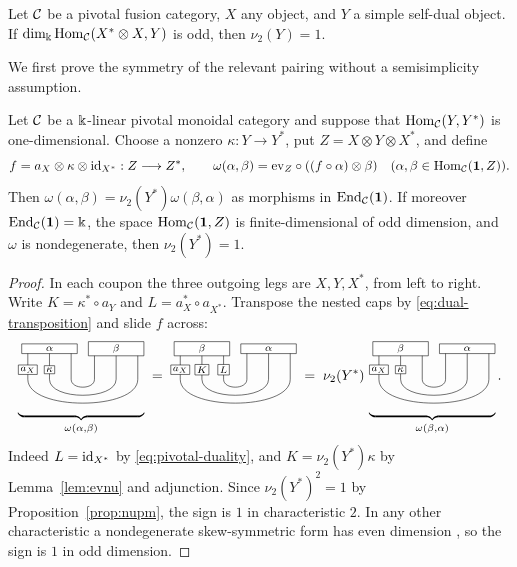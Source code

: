 \documentclass{amsart}
\begin{document}
\begin{theorem}\label{thm:FrobSchur}
Let $\mathcal{C}$ be a pivotal fusion category, $X$ any object, and $Y$ a simple
self-dual object. If $\dim_{\Bbbk}\mathrm{Hom}_{\mathcal{C}}(X^*\otimes X,Y)$ is odd, then
$\nu_2(Y)=1$.
\end{theorem}
We first prove the symmetry of the relevant pairing without a
semisimplicity assumption.
\begin{lemma}\label{prop:binu}\label{cor:inter}
Let $\mathcal{C}$ be a $\Bbbk$-linear pivotal monoidal category and suppose that $\mathrm{Hom}_{\mathcal{C}}(Y,Y^*)$ is one-dimensional.
Choose a nonzero $\kappa:Y\to Y^*$, put $Z=X\otimes Y\otimes X^*$, and
define
\[
 f=a_X\otimes\kappa\otimes\mathrm{id}_{X^*}:Z\longrightarrow Z^*,
 \qquad
 \omega(\alpha,\beta)=\mathrm{ev}_Z\circ((f\circ\alpha)\otimes\beta)
 \quad(\alpha,\beta\in\mathrm{Hom}_{\mathcal{C}}({\bf 1},Z)).
\]
Then $\omega(\alpha,\beta)=\nu_2(Y^*)\omega(\beta,\alpha)$ as morphisms
in $\mathrm{End}_{\mathcal{C}}({\bf 1})$. If moreover $\mathrm{End}_{\mathcal{C}}({\bf 1})=\Bbbk$, the space
$\mathrm{Hom}_{\mathcal{C}}({\bf 1},Z)$ is finite-dimensional of odd dimension, and $\omega$ is
nondegenerate, then $\nu_2(Y^*)=1$.
\end{lemma}
\begin{proof}
In each coupon the three outgoing legs are $X,Y,X^*$, from left to right.
Write $K=\kappa^*\circ a_Y$ and $L=a_X^*\circ a_{X^*}$. Transpose the
nested caps by \eqref{eq:dual-transposition} and slide $f$ across:
\newcommand{\paritycaps}[4]{%
 \vcenter{\hbox{\begin{tikzpicture}[x=.84cm,y=.76cm,font=\scriptsize]
 \foreach \x in {0,.65,1.3,2.0,2.65,3.3}{\draw (\x,.94)--(\x,-.08);}
 \foreach \a/\b/\h in {1.3/2.0/.43,.65/2.65/.79,0/3.3/1.14}{
   \draw (\a,-.08)..controls(\a,-\h) and (\b,-\h)..(\b,-.08);}
 \node[draw,fill=white,minimum width=1.40cm,inner sep=2pt] at (.65,.94){$#1$};
 \node[draw,fill=white,minimum width=1.40cm,inner sep=2pt] at (2.65,.94){$#2$};
 \node[draw,fill=white,inner sep=1.4pt] at (0,.24){$a_X$};
 \node[draw,fill=white,inner sep=1.4pt] at (.65,.24){$#3$};
 \if\relax\detokenize{#4}\relax\else\node[draw,fill=white,inner sep=1.4pt] at (1.30,.24){$#4$};\fi
 \end{tikzpicture}}}}
\[
 \underbrace{\paritycaps{\alpha}{\beta}{\kappa}{}}_{\omega(\alpha,\beta)}
 \;=\;\paritycaps{\beta}{\alpha}{K}{L}
 \;=\;\nu_2(Y^*)\,\underbrace{\paritycaps{\beta}{\alpha}{\kappa}{}}_{\omega(\beta,\alpha)}.
\]
Indeed $L=\mathrm{id}_{X^*}$ by \eqref{eq:pivotal-duality}, and
$K=\nu_2(Y^*)\kappa$ by Lemma~\ref{lem:evnu} and adjunction.
Since $\nu_2(Y^*)^2=1$ by Proposition~\ref{prop:nupm}, the sign is
$1$ in characteristic $2$. In any other characteristic a nondegenerate
skew-symmetric form has even dimension
\cite[\S5, no.~1, Theorem~1]{BourbakiForms}, so the sign is $1$ in odd dimension.
\end{proof}
\end{document}
